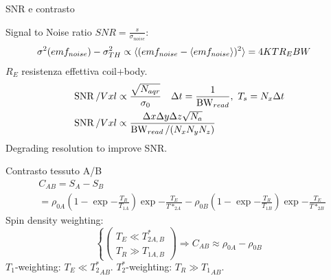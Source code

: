 \begin{frame}[allowframebreaks]{SNR e contrasto}
\begin{block}{Signal to Noise ratio}
$SNR=\frac{s}{\sigma_{noise}}$:
\begin{align*}
&\sigma^2(emf_{noise})-\sigma_{TH}^2\propto\langle (emf_{noise}-\langle emf_{noise} \rangle)^2 \rangle=4KTR_EBW
\end{align*}
$R_E$ resistenza effettiva coil+body.
\begin{align*}
&\operatorname{SNR}/Vxl\propto\frac{\sqrt{N_{aqr}}}{\sigma_0}\quad \Delta t= \frac{1}{\operatorname{BW}_{read}},\ T_s=N_x\Delta t\\
&\operatorname{SNR}/Vxl\propto \frac{\Delta x\Delta y\Delta z\sqrt{N_a}}{\operatorname{BW}_{read}/(N_xN_yN_z)}
\end{align*}
Degrading resolution to improve SNR.
\end{block}
\begin{block}{Contrasto tessuto A/B}
\begin{align*}
&C_{AB}=S_A-S_B\\
&=\rho_{0A}(1-\exp{-\frac{T_R}{T_{1A}}})\exp{-\frac{T_E}{T*_{2A}}}-\rho_{0B}(1-\exp{-\frac{T_R}{T_{1B}}})\exp{-\frac{T_E}{T*_{2B}}}
\end{align*}
Spin density weighting:
\begin{equation*}
\left\{\begin{pmatrix}T_E\ll T_{2A,B}^*\\ T_R\gg T_{1A,B}\end{pmatrix}\right.\Rightarrow C_{AB}\approx\rho_{0A}-\rho_{0B}
\end{equation*}
$T_1$-weighting: $T_E\ll {T_2^*}_{AB}$.
$T_2^*$-weighting: $T_R\gg {T_1}_{AB}$.
\end{block}
\end{frame}